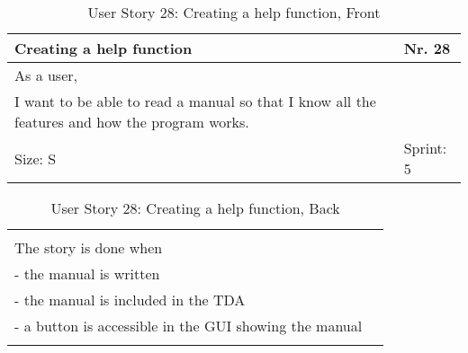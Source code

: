 \begin{table}[H]
  \caption{User Story 28: Creating a help function, Front}
  \label{Story_28_Front}
  \centering
  \begin{tabular}{|p{9cm} p{2cm}|}
	\hline  	
  	Creating a help function & Nr. 28 \\ 
  	\hline
  	As a user, &    \\ 
  	I want to be able to read a manual so that I know all the features and how the program works. &    \\ 
  	Size: S & Sprint: 5 \\ 
  	\hline
  \end{tabular}
\end{table}
\begin{table}[H]
  \caption{User Story 28: Creating a help function, Back}
  \label{Story_28_Back}
  \centering
  \begin{tabular}{|p{10cm} p{1cm}|}
  \hline
  	  &    \\ 
  	The story is done when &    \\ 
  	 - the manual is written & \\ 
  	 - the manual is included in the TDA & \\ 
  	 - a button is accessible in the GUI showing the manual & \\
  	 
  	  &  
  	   \\ 
  	\hline
  \end{tabular}
\end{table} 

\ \\ 

